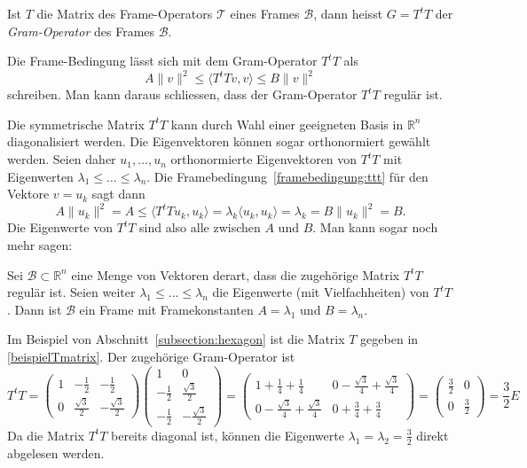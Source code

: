 \begin{definition}
\label{definition:gram-operator}
Ist $T$ die Matrix des Frame-Operators $\mathcal{T}$ eines Frames
$\mathcal{B}$, dann heisst $G=T^tT$ der {\em Gram-Operator} des Frames
$\mathcal{B}$.
\end{definition}

Die Frame-Bedingung lässt sich mit dem Gram-Operator $T^tT$ als
\begin{equation}
A \|v\|^2
\le
\langle T^t T v,v\rangle
\le
B \|v\|^2
\label{framebedingung:ttt}
\end{equation}
schreiben.
Man kann daraus schliessen, dass der Gram-Operator $T^tT$ regulär ist.

Die symmetrische Matrix $T^tT$ kann durch Wahl einer geeigneten Basis
in $\mathbb R^n$ diagonalisiert werden.
Die Eigenvektoren können sogar orthonormiert gewählt werden.
Seien daher $u_1,\dots,u_n$ orthonormierte Eigenvektoren von $T^tT$
mit Eigenwerten $\lambda_1\le\dots\le\lambda_n$.
Die Framebedingung~\eqref{framebedingung:ttt}
für den Vektore $v=u_k$ sagt dann
\[
A \| u_k\|^2
=
A
\le
\langle T^tTu_k,u_k\rangle
=
\lambda_k\langle u_k,u_k\rangle
=
\lambda_k
=
B \| u_k\|^2
=
B.
\]
Die Eigenwerte von $T^tT$ sind also alle zwischen $A$ und $B$.
Man kann sogar noch mehr sagen:

\begin{satz}
Sei $\mathcal{B}\subset\mathbb R^n$ eine Menge von Vektoren derart,
dass die zugehörige Matrix $T^tT$ regulär ist.
Seien weiter $\lambda_1\le\dots\le \lambda_n$ die Eigenwerte
(mit Vielfachheiten) von $T^tT$.
Dann ist $\mathcal{B}$ ein Frame mit Framekonstanten
$A=\lambda_1$ und $B=\lambda_n$.
\end{satz}

\begin{beispiel}
Im Beispiel von Abschnitt~\ref{subsection:hexagon} ist die Matrix $T$
gegeben in \eqref{beispielTmatrix}.
Der zugehörige Gram-Operator ist
\[
T^tT
=
\begin{pmatrix}
1& -\frac12        &-\frac12          \\[2pt]
0& \frac{\sqrt{3}}2& -\frac{\sqrt{3}}2
\end{pmatrix}
\begin{pmatrix}
1&0\\
-\frac12&\frac{\sqrt{3}}2\\[2pt]
-\frac12&-\frac{\sqrt{3}}2
\end{pmatrix}
=
\begin{pmatrix}
1+\frac14+\frac14 & 0-\frac{\sqrt{3}}4+\frac{\sqrt{3}}4\\[2pt]
0-\frac{\sqrt{3}}4+\frac{\sqrt{3}}4&0+\frac{3}{4}+\frac{3}{4}
\end{pmatrix}
=
\begin{pmatrix}
\frac32&0\\
0&\frac32
\end{pmatrix}
=
\frac{3}{2}E
\]
Da die Matrix $T^tT$ bereits diagonal ist, können die Eigenwerte
$\lambda_1=\lambda_2=\frac32$ direkt abgelesen werden.
\end{beispiel}

